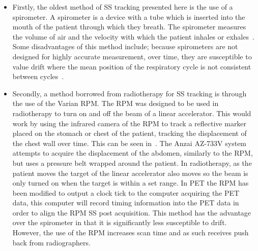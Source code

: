                 \begin{itemize}
                    \item Firstly, the oldest method of \gls{SS} tracking presented here is the use of a spirometer. A spirometer is a device with a tube which is inserted into the mouth of the patient through which they breath. The spirometer measures the volume of air and the velocity with which the patient inhales or exhales~. Some disadvantages of this method include; %
                    because spirometers are not designed for highly accurate measurement, over time, they are susceptible to value drift where the mean position of the respiratory cycle is not consistent between cycles~.
                    
                    \item Secondly, a method borrowed from radiotherapy for \gls{SS} tracking is through the use of the Varian \gls{RPM}. The \gls{RPM} was designed to be used in radiotherapy to turn on and off the beam of a linear accelerator. This would work by using the infrared camera of the \gls{RPM} to track a reflective marker placed on the stomach or chest of the patient, tracking the displacement of the chest wall over time. This can be seen in~. The Anzai AZ-733V system attempts to acquire the displacement of the abdomen, similarly to the \gls{RPM}, but uses a pressure belt wrapped around the patient. In radiotherapy, as the patient moves the target of the linear accelerator also moves so the beam is only turned on when the target is within a set range. In \gls{PET} the \gls{RPM} has been modified to output a clock tick to the computer acquiring the \gls{PET} data, this computer will %
                    record timing information into the \gls{PET} data in order to align the \gls{RPM} \gls{SS} post acquisition. This method has the advantage over the spirometer in that it is significantly less susceptible to drift. However, the use of the \gls{RPM} increases scan time and as such receives push back from radiographers.
                    

\end{itemize}
